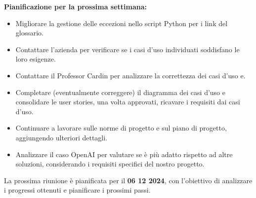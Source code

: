 \documentclass{article}
\newcommand{\isEsterno}{0}
\begin{document}
    \textbf{Pianificazione per la prossima settimana:} 
    \begin{itemize}
        \item Migliorare la gestione delle eccezioni nello script Python per i link del glossario.
        \item Contattare l'azienda per verificare se i casi d'uso individuati soddisfano le loro esigenze.
        \item Contattare il Professor Cardin per analizzare la correttezza dei casi d'uso e.
        \item Completare (eventualmente correggere) il diagramma dei casi d'uso e consolidare le user stories, una volta approvati, ricavare i requisiti dai casi d'uso.
        \item Continuare a lavorare sulle norme di progetto e sul piano di progetto, aggiungendo ulteriori dettagli.
        \item Analizzare il caso OpenAI per valutare se è più adatto rispetto ad altre soluzioni, considerando i requisiti specifici del nostro progetto.
    \end{itemize}

    La prossima riunione è pianificata per il \textbf{06 12 2024}, con l'obiettivo di analizzare i progressi ottenuti e pianificare i prossimi passi.




\ifthenelse{\equal{\isEsterno}{1}}{
    \begin{table}[b]
        \begin{tabular}{@{}p{.5in}p{4in}@{}}
            Data:  & \hrulefill \\
                   &     		\\
                   &     		\\
            Firma: & \hrulefill \\
        \end{tabular}
        \end{table}
}{}
\end{document}

